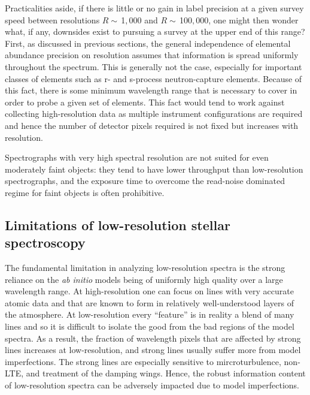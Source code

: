 \documentclass[iop]{emulateapj}
\begin{document}
\begin{CJK*}{UTF8}{gbsn}
Practicalities aside, if there is little or no gain in label precision at a given survey speed between resolutions $R\sim \,$1$,$000 and $R\sim \,$100$,$000, one might then wonder what, if any, downsides exist to pursuing a survey at the upper end of this range? First, as discussed in previous sections, the general independence of elemental abundance precision on resolution assumes that information is spread uniformly throughout the spectrum. This is generally not the case, especially for important classes of elements such as r- and s-process neutron-capture elements. Because of this fact, there is some minimum wavelength range that is necessary to cover in order to probe a given set of elements. This fact would tend to work against collecting high-resolution data as multiple instrument configurations are required and hence the number of detector pixels required is not fixed but increases with resolution. 

Spectrographs with very high spectral resolution are not suited for even moderately faint objects: they tend to have lower throughput than low-resolution spectrographs, and the exposure time to overcome the read-noise dominated regime for faint objects is often prohibitive.


%
%
%
%
%
%

\subsection{Limitations of low-resolution stellar spectroscopy}
\label{sec:limitations}

The fundamental limitation in analyzing low-resolution spectra is the strong reliance on the {\it ab initio} models being of uniformly high quality over a large wavelength range. At high-resolution one can focus on lines with very accurate atomic data and that are known to form in relatively well-understood layers of the atmosphere. At low-resolution every ``feature'' is in reality a blend of many lines and so it is difficult to isolate the good from the bad regions of the model spectra. As a result, the fraction of wavelength pixels that are affected by strong lines increases at low-resolution, and strong lines usually suffer more from model imperfections.  The strong lines are especially sensitive to mircroturbulence, non-LTE, and treatment of the damping wings. Hence, the robust information content of low-resolution spectra can be adversely impacted due to model imperfections.


\end{CJK*}
\end{document}
